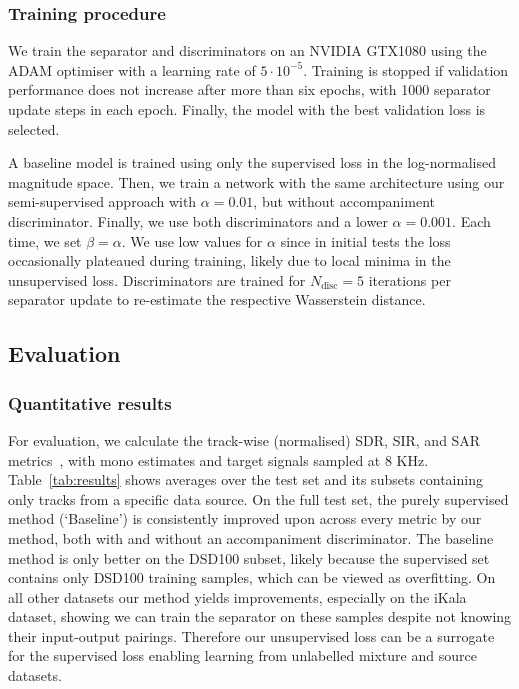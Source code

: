 \documentclass{article}
\begin{document}
\subsubsection{Training procedure}
We train the separator and discriminators on an NVIDIA GTX1080 using the ADAM optimiser with a learning rate of $5 \cdot 10^{-5}$.
Training is stopped if validation performance does not increase after more than six epochs, with 1000 separator update steps in each epoch.
Finally, the model with the best validation loss is selected.

A baseline model is trained using only the supervised loss in the log-normalised magnitude space.
Then, we train a network with the same architecture using our semi-supervised approach with $\alpha = 0.01$, but without accompaniment discriminator.
Finally, we use both discriminators and a lower $\alpha=0.001$.
Each time, we set $\beta = \alpha$.
We use low values for $\alpha$ since in initial tests the loss occasionally plateaued during training, likely due to local minima in the unsupervised loss.
Discriminators are trained for $N_{\text{disc}} = 5$ iterations per separator update to re-estimate the respective Wasserstein distance.

\subsection{Evaluation}
\subsubsection{Quantitative results}

For evaluation, we calculate the track-wise (normalised) SDR, SIR, and SAR metrics~\cite{Vincent2006}, with mono estimates and target signals sampled at 8 KHz. Table~\ref{tab:results} shows averages over the test set and its subsets containing only tracks from a specific data source.
On the full test set, the purely supervised method (`Baseline') is consistently improved upon across every metric by our method, both with and without an accompaniment discriminator.
The baseline method is only better on the DSD100 subset, likely because the supervised set contains only DSD100 training samples, which can be viewed as overfitting.
On all other datasets our method yields improvements, especially on the iKala dataset, showing we can train the separator on these samples despite not knowing their input-output pairings.
Therefore our unsupervised loss can be a surrogate for the supervised loss enabling learning from unlabelled mixture and source datasets.
\end{document}
